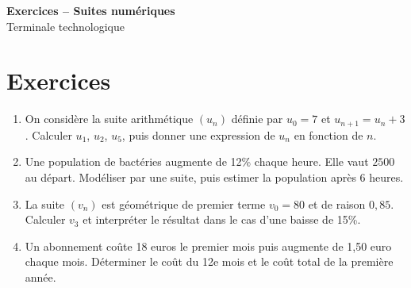 \documentclass[french,11pt]{book}
\begin{document}
\begin{center}
{\Large \textbf{Exercices -- Suites numériques}}\\[2mm]
Terminale technologique
\end{center}

\section*{Exercices}
\begin{enumerate}
  \item On considère la suite arithmétique $(u_n)$ définie par $u_0=7$ et $u_{n+1}=u_n+3$. Calculer $u_1$, $u_2$, $u_5$, puis donner une expression de $u_n$ en fonction de $n$.
  \item Une population de bactéries augmente de 12\% chaque heure. Elle vaut $2500$ au départ. Modéliser par une suite, puis estimer la population après 6 heures.
  \item La suite $(v_n)$ est géométrique de premier terme $v_0=80$ et de raison $0,85$. Calculer $v_3$ et interpréter le résultat dans le cas d'une baisse de 15\%.
  \item Un abonnement coûte 18 euros le premier mois puis augmente de 1,50 euro chaque mois. Déterminer le coût du 12e mois et le coût total de la première année.
\end{enumerate}
\end{document}
